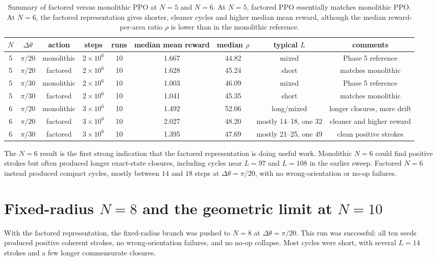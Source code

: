 \documentclass[11pt]{article}
\newcommand{\dth}{\Delta\theta}
\begin{document}
\begin{table}[htbp]
\centering
\scriptsize
\begin{tabular}{ccccccccc}
\toprule
$N$ & $\dth$ & action & steps & runs & median mean reward & median $\rho$ & typical $L$ & comments \\
\midrule
5 & $\pi/20$ & monolithic & $2\times 10^6$ & 10 & 1.667 & 44.82 & mixed & Phase 5 reference \\
5 & $\pi/20$ & factored   & $2\times 10^6$ & 10 & 1.628 & 45.24 & short & matches monolithic \\
5 & $\pi/30$ & monolithic & $2\times 10^6$ & 10 & 1.003 & 46.09 & mixed & Phase 5 reference \\
5 & $\pi/30$ & factored   & $2\times 10^6$ & 10 & 1.041 & 45.35 & short & matches monolithic \\
\midrule
6 & $\pi/20$ & monolithic & $3\times 10^6$ & 10 & 1.492 & 52.06 & long/mixed & longer closures, more drift \\
6 & $\pi/20$ & factored   & $3\times 10^6$ & 10 & 2.027 & 48.20 & mostly 14--18, one 32 & cleaner and higher reward \\
6 & $\pi/30$ & factored   & $3\times 10^6$ & 10 & 1.395 & 47.69 & mostly 21--25, one 49 & clean positive strokes \\
\bottomrule
\end{tabular}
\caption{Summary of factored versus monolithic PPO at $N=5$ and $N=6$. At $N=5$, factored PPO essentially matches monolithic PPO. At $N=6$, the factored representation gives shorter, cleaner cycles and higher median mean reward, although the median reward-per-area ratio $\rho$ is lower than in the monolithic reference.}
\label{tab:phase6-n5-n6}
\end{table}

The $N=6$ result is the first strong indication that the factored representation is doing useful work. Monolithic $N=6$ could find positive strokes but often produced longer exact-state closures, including cycles near $L=97$ and $L=108$ in the earlier sweep. Factored $N=6$ instead produced compact cycles, mostly between $14$ and $18$ steps at $\dth=\pi/20$, with no wrong-orientation or no-op failures.

\section{Fixed-radius $N=8$ and the geometric limit at $N=10$}

With the factored representation, the fixed-radius branch was pushed to $N=8$ at $\dth=\pi/20$. This run was successful: all ten seeds produced positive coherent strokes, no wrong-orientation failures, and no no-op collapse. Most cycles were short, with several $L=14$ strokes and a few longer commensurate closures.
\end{document}
